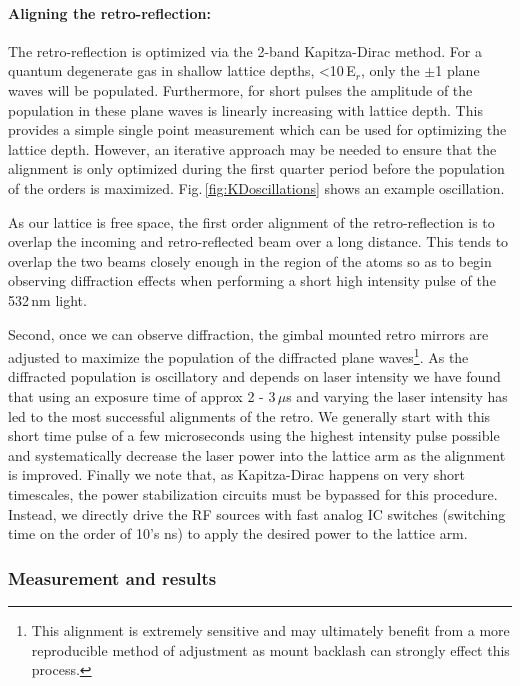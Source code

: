 \paragraph{Aligning the retro-reflection:}
The retro-reflection is optimized via the 2-band Kapitza-Dirac method.
For a quantum degenerate gas in shallow lattice depths, <10\,E$_r$, only the $\pm$1 plane waves will be populated.
Furthermore, for short pulses the amplitude of the population in these plane waves is linearly increasing with lattice depth.
This provides a simple single point measurement which can be used for optimizing the lattice depth.
However, an iterative approach may be needed to ensure that the alignment is only optimized during the first quarter period before the population of the orders is maximized.
Fig.\,\ref{fig:KDoscillations} shows an example oscillation.

As our lattice is free space, the first order alignment of the retro-reflection is to overlap the incoming and retro-reflected beam over a long distance.
This tends to overlap the two beams closely enough in the region of the atoms so as to begin observing diffraction effects when performing a short high intensity pulse of the 532\,nm light.

Second, once we can observe diffraction, the gimbal mounted retro mirrors are adjusted to maximize the population of the diffracted plane waves\footnote{This alignment is extremely sensitive and may ultimately benefit from a more reproducible method of adjustment as mount backlash can strongly effect this process.}.
As the diffracted population is oscillatory and depends on laser intensity we have found that using an exposure time of approx 2 - 3\,$\mu$s and varying the laser intensity has led to the most successful alignments of the retro.
We generally start with this short time pulse of a few microseconds using the highest intensity pulse possible and systematically decrease the laser power into the lattice arm as the alignment is improved.
Finally we note that, as Kapitza-Dirac happens on very short timescales, the power stabilization circuits must be bypassed for this procedure.
Instead, we directly drive the RF sources with fast analog IC switches (switching time on the order of 10's ns) to apply the desired power to the lattice arm.

\subsubsection{Measurement and results}
